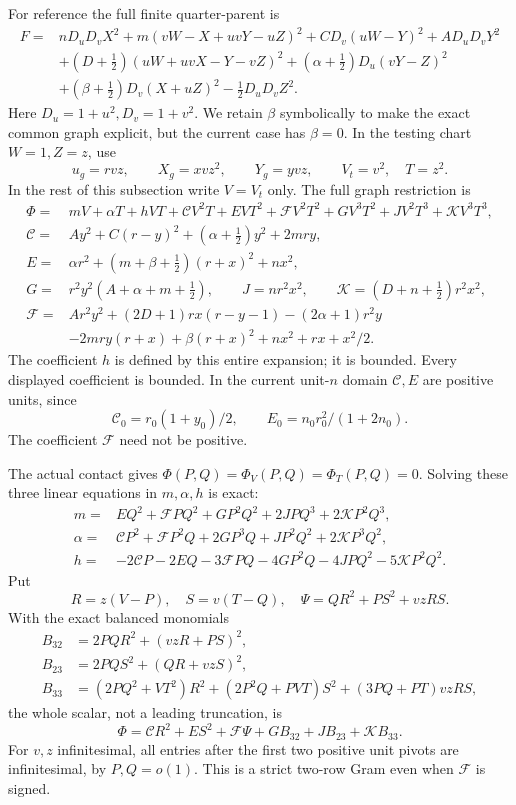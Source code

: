 For reference the full finite quarter-parent is
\[
\begin{aligned}
F={}&nD_uD_vX^2+m(vW-X+uvY-uZ)^2
       +CD_v(uW-Y)^2+AD_uD_vY^2\\
 &+(D+\tfrac12)(uW+uvX-Y-vZ)^2
       +(\alpha+\tfrac12)D_u(vY-Z)^2\\
 &+(\beta+\tfrac12)D_v(X+uZ)^2-\tfrac12D_uD_vZ^2 .
\end{aligned}\tag{WA12}
\]
Here \(D_u=1+u^2,D_v=1+v^2\). We retain \(\beta\) symbolically to make
the exact common graph explicit, but the current case has \(\beta=0\).
In the testing chart \(W=1,Z=z\), use
\[
 u_g=rvz,\qquad X_g=xvz^2,\qquad Y_g=yvz,\qquad
 V_t=v^2,\quad T=z^2.
 \tag{WA13}
\]
In the rest of this subsection write \(V=V_t\) only. The full graph
restriction is
\[
\begin{aligned}
\Phi={}&mV+\alpha T+hVT+\mathcal C V^2T+EVT^2
   +\mathcal F V^2T^2+GV^3T^2+JV^2T^3+\mathcal K V^3T^3,\\
\mathcal C={}&Ay^2+C(r-y)^2+(\alpha+\tfrac12)y^2+2mry,\\
E={}&\alpha r^2+(m+\beta+\tfrac12)(r+x)^2+nx^2,\\
G={}&r^2y^2(A+\alpha+m+\tfrac12),\qquad
J=nr^2x^2,\qquad \mathcal K=(D+n+\tfrac12)r^2x^2,\\
\mathcal F={}&Ar^2y^2+(2D+1)rx(r-y-1)-(2\alpha+1)r^2y\\
 &-2mry(r+x)+\beta(r+x)^2+nx^2+rx+x^2/2 .
\end{aligned}\tag{WA14}
\]
The coefficient \(h\) is defined by this entire expansion; it is bounded.
Every displayed coefficient is bounded. In the current unit-\(n\)
domain \(\mathcal C,E\) are positive units, since
\[
 \mathcal C_0=r_0(1+y_0)/2,\qquad
 E_0=n_0r_0^2/(1+2n_0).
 \tag{WA15}
\]
The coefficient \(\mathcal F\) need not be positive.

The actual contact gives \(\Phi(P,Q)=\Phi_V(P,Q)=\Phi_T(P,Q)=0\).
Solving these three linear equations in \(m,\alpha,h\) is exact:
\[
\begin{aligned}
m={}&EQ^2+\mathcal F PQ^2+GP^2Q^2+2JPQ^3+2\mathcal K P^2Q^3,\\
\alpha={}&\mathcal C P^2+\mathcal F P^2Q+2GP^3Q
                         +JP^2Q^2+2\mathcal K P^3Q^2,\\
h={}&-2\mathcal CP-2EQ-3\mathcal FPQ-4GP^2Q
                         -4JPQ^2-5\mathcal K P^2Q^2 .
\end{aligned}\tag{WA16}
\]
Put
\[
 R=z(V-P),\quad S=v(T-Q),\quad
 \Psi=QR^2+PS^2+vzRS .
\]
With the exact balanced monomials
\[
\begin{aligned}
B_{32}&=2PQR^2+(vzR+PS)^2,\\
B_{23}&=2PQS^2+(QR+vzS)^2,\\
B_{33}&=(2PQ^2+VT^2)R^2+(2P^2Q+PVT)S^2
                              +(3PQ+PT)vzRS,
\end{aligned}\tag{WA17}
\]
the whole scalar, not a leading truncation, is
\[
 \Phi=\mathcal CR^2+ES^2+\mathcal F\Psi
                          +GB_{32}+JB_{23}+\mathcal K B_{33}.
 \tag{WA18}
\]
For \(v,z\) infinitesimal, all entries after the first two positive
unit pivots are infinitesimal, by \(P,Q=o(1)\). This is a strict
two-row Gram even when \(\mathcal F\) is signed.

